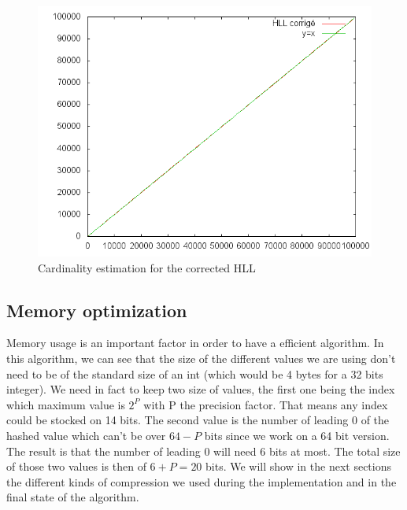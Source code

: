 \documentclass{article}
\begin{document}
\begin{center}
\begin{figure}[h]
\includegraphics[scale=0.7]{img02.png}
\caption{Cardinality estimation for the corrected HLL}
\end{figure}
\end{center}


\subsection{Memory optimization}
Memory usage is an important factor in order to have a efficient
algorithm. In this algorithm, we can see that the size of the
different values we are using don't need to be of the standard size of
an int (which would be 4 bytes for a 32 bits integer). We need in fact
to keep two size of values, the first one being the index which
maximum value is $2^{P}$ with P the precision factor. That means any
index could be stocked on 14 bits. The second value is the number of
leading 0 of the hashed value which can't be over $64-P$ bits since we
work on a 64 bit version. The result is that the number of leading 0
will need 6 bits at most. The total size of those two values is then
of $6+P = 20$ bits. We will show in the next sections the different
kinds of compression we used during the implementation and in the
final state of the algorithm.
\end{document}
